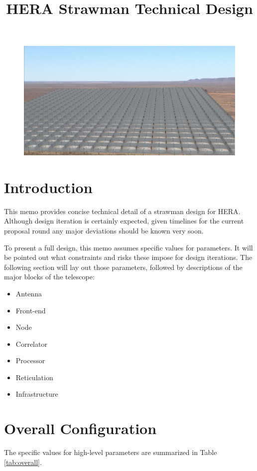 \documentclass[11pt]{article}
\begin{document}
\title{HERA Strawman Technical Design}
\maketitle
\begin{figure}[H]
\centering
\includegraphics[width=\textwidth]{hera_14m_view0611-1252.png}
\end{figure}

\section{Introduction} 
This memo provides concise technical detail of a strawman design for HERA.  Although design iteration is certainly expected, given timelines for the current proposal round any major deviations should be known very soon.

To present a full design, this memo assumes specific values for parameters.  It will be pointed out what constraints and risks these impose for design iterations.  The following section will lay out those parameters, followed by descriptions of the major blocks of the telescope:

\begin{itemize}
\item Antenna
\item Front-end
\item Node
\item Correlator
\item Processor
\item Reticulation
\item Infrastructure
\end{itemize}

\section{Overall Configuration}
The specific values for high-level parameters are summarized in Table \ref{tab:overall}.
\end{document}

